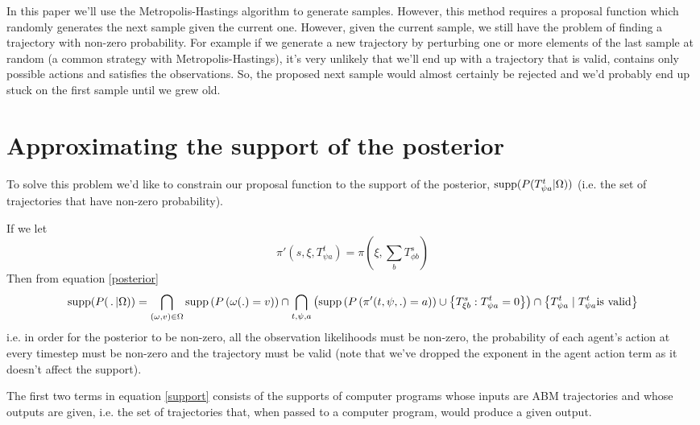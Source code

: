 In this paper we'll use the Metropolis-Hastings algorithm to generate samples. However, this method requires a proposal function which randomly generates the next sample given the current one. However, given the current sample, we still have the problem of finding a trajectory with non-zero probability. For example if we generate a new trajectory by perturbing one or more elements of the last sample at random (a common strategy with Metropolis-Hastings), it's very unlikely that we'll end up with a trajectory that is valid, contains only possible actions and satisfies the observations. So, the proposed next sample would almost certainly be rejected and we'd probably end up stuck on the first sample until we grew old.

\section{Approximating the support of the posterior}


To solve this problem we'd like to constrain our proposal function to the support of the posterior, $\operatorname{supp}(P(T^t_{\psi a}|\Omega))$ (i.e. the set of trajectories that have non-zero probability).

If we let
\[
\pi'(s, \xi, T^t_{\psi a}) = \pi(\xi,\sum_bT^{s}_{\phi b})
\]
Then from equation \ref{posterior}
\begin{equation}
\operatorname{supp} (P( \,.\, |\Omega)) = 
\bigcap_{(\omega,v) \in \Omega}  \operatorname{supp}\left(P\left(\omega(.)=v\right)\right) \cap
\bigcap_{t, \psi, a} \left(\operatorname{supp}\left(P\left( \pi'(t,\psi,.) = a \right)\right) \cup \left\{T^s_{\xi b}: T^t_{\psi a} = 0\right\}\right) \cap
\left\{T^t_{\psi a} \mid T^t_{\psi a} \text{is valid}\right\}
\label{support}
\end{equation}
i.e. in order for the posterior to be non-zero, all the observation likelihoods must be non-zero, the probability of each agent's action at every timestep must be non-zero and the trajectory must be valid (note that we've dropped the exponent in the agent action term as it doesn't affect the support).

The first two terms in equation \ref{support} consists of the supports of computer programs whose inputs are ABM trajectories and whose outputs are given, i.e. the set of trajectories that, when passed to a computer program, would produce a given output.

